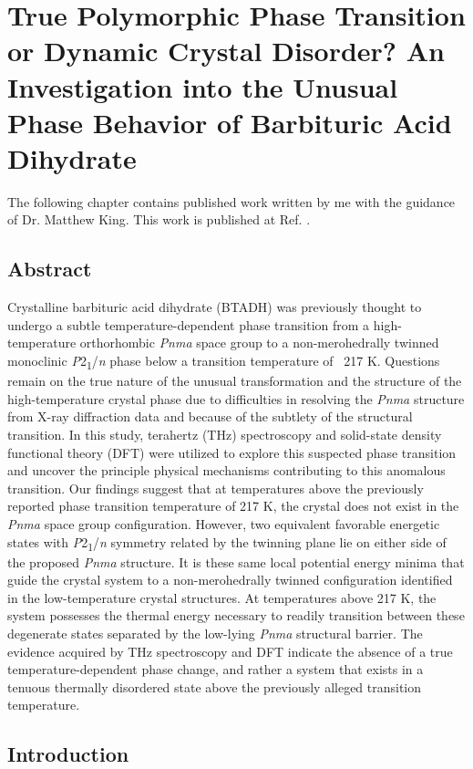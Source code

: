 \chapter{True Polymorphic Phase Transition or Dynamic Crystal Disorder? An Investigation into the Unusual Phase Behavior of Barbituric Acid Dihydrate} 
The following chapter contains published work written by me with the guidance of Dr. Matthew King. This work is published at Ref. \citep{paul_true_2019}. 
\label{chap:BTADH}
\section{Abstract}
Crystalline barbituric acid dihydrate (BTADH) was previously thought to undergo a subtle temperature-dependent phase transition from a high-temperature orthorhombic \textit{Pnma} space group to a non-merohedrally twinned monoclinic \textit{P}2\textsubscript{1}/\textit{n} phase below a transition temperature of ~217 K. Questions remain on the true nature of the unusual transformation and the structure of the high-temperature crystal phase due to difficulties in resolving the \textit{Pnma} structure from X-ray diffraction data and because of the subtlety of the structural transition. In this study, terahertz (THz) spectroscopy and solid-state density functional theory (DFT) were utilized to explore this suspected phase transition and uncover the principle physical mechanisms contributing to this anomalous transition. Our findings suggest that at temperatures above the previously reported phase transition temperature of 217 K, the crystal does not exist in the \textit{Pnma} space group configuration. However, two equivalent favorable energetic states with \textit{P}2\textsubscript{1}/\textit{n} symmetry related by the twinning plane lie on either side of the proposed \textit{Pnma} structure. It is these same local potential energy minima that guide the crystal system to a non-merohedrally twinned configuration identified in the low-temperature crystal structures. At temperatures above 217 K, the system possesses the thermal energy necessary to readily transition between these degenerate states separated by the low-lying \textit{Pnma} structural barrier. The evidence acquired by THz spectroscopy and DFT indicate the absence of a true temperature-dependent phase change, and rather a system that exists in a tenuous thermally disordered state above the previously alleged transition temperature.
\section{Introduction}

